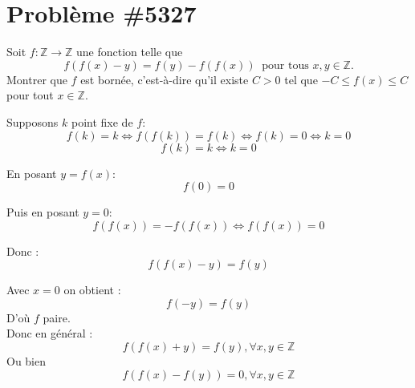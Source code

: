 \documentclass[12pt]{article}
\begin{document}
\section*{Problème \#5327}
Soit $f : \mathbb{Z} \to \mathbb{Z}$ une fonction telle que
$$f(f(x)-y) = f(y) - f(f(x)) \ \text{ pour tous } x, y \in \mathbb{Z}.$$
Montrer que $f$ est bornée, c'est-à-dire qu'il existe $C > 0$ tel que $-C \leq f(x) \leq C$ pour tout $x \in \mathbb{Z}.$
\par\vspace{-.5\ht\strutbox}\noindent\hrulefill\par

Supposons $k$ point fixe de $f:$
$$f(k)=k \iff f(f(k)) = f(k) \iff f(k) = 0 \iff k=0$$
$$\boxed{f(k) = k \iff k=0}$$

En posant $y=f(x):$
$$\boxed{f(0) = 0}$$

Puis en posant $y=0:$
$$f(f(x)) = -f(f(x)) \iff \boxed{f(f(x)) = 0}$$

Donc $:$
$$\boxed{f(f(x) - y) = f(y)}$$

Avec $x=0$ on obtient :
$$\boxed{f(-y) = f(y)}$$
D'où $f$ paire. \\

Donc en général $:$
$$f(f(x) + y) = f(y), \forall x,y \in \mathbb{Z}$$
Ou bien 
$$f(f(x) - f(y)) = 0 , \forall x,y \in \mathbb{Z}$$
\end{document}
